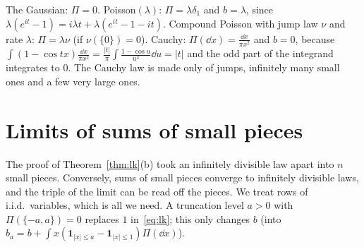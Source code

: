 \begin{example}\label{ex:lkexamples}
The Gaussian: $\Pi=0$. Poisson$(\lambda)$: $\Pi=\lambda\delta_1$ and $b=\lambda$, since $\lambda(e^{it}-1)=i\lambda t+\lambda(e^{it}-1-it)$. Compound Poisson with
jump law $\nu$ and rate $\lambda$: $\Pi=\lambda\nu$ (if $\nu(\{0\})=0$). Cauchy: $\Pi(\dd x)=\frac{\dd x}{\pi x^2}$ and $b=0$, because
$\int(1-\cos tx)\frac{\dd x}{\pi x^2}=\frac{|t|}\pi\int\frac{1-\cos u}{u^2}\dd u=|t|$ and the odd part of the integrand integrates to $0$. The Cauchy law is
made only of jumps, infinitely many small ones and a few very large ones.
\end{example}

\section{Limits of sums of small pieces}

The proof of Theorem~\ref{thm:lk}(b) took an infinitely divisible law apart into $n$ small pieces. Conversely, sums of small pieces converge to
infinitely divisible laws, and the triple of the limit can be read off the pieces. We treat rows of i.i.d.\ variables, which is all we need. A truncation
level $a>0$ with $\Pi(\{-a,a\})=0$ replaces $1$ in~\eqref{eq:lk}; this only changes $b$ (into $b_a=b+\int x(\mathbf 1_{|x|\le a}-\mathbf 1_{|x|\le1})\Pi(\dd x)$).

